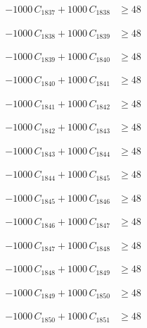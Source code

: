 \documentclass[a4paper,11pt]{article}
\begin{document}
\begin{align}
-1000\,C_{1837} + 1000\,C_{1838} &\geq 48 \nonumber
\end{align}

\begin{align}
-1000\,C_{1838} + 1000\,C_{1839} &\geq 48 \nonumber
\end{align}

\begin{align}
-1000\,C_{1839} + 1000\,C_{1840} &\geq 48 \nonumber
\end{align}

\begin{align}
-1000\,C_{1840} + 1000\,C_{1841} &\geq 48 \nonumber
\end{align}

\begin{align}
-1000\,C_{1841} + 1000\,C_{1842} &\geq 48 \nonumber
\end{align}

\begin{align}
-1000\,C_{1842} + 1000\,C_{1843} &\geq 48 \nonumber
\end{align}

\begin{align}
-1000\,C_{1843} + 1000\,C_{1844} &\geq 48 \nonumber
\end{align}

\begin{align}
-1000\,C_{1844} + 1000\,C_{1845} &\geq 48 \nonumber
\end{align}

\begin{align}
-1000\,C_{1845} + 1000\,C_{1846} &\geq 48 \nonumber
\end{align}

\begin{align}
-1000\,C_{1846} + 1000\,C_{1847} &\geq 48 \nonumber
\end{align}

\begin{align}
-1000\,C_{1847} + 1000\,C_{1848} &\geq 48 \nonumber
\end{align}

\begin{align}
-1000\,C_{1848} + 1000\,C_{1849} &\geq 48 \nonumber
\end{align}

\begin{align}
-1000\,C_{1849} + 1000\,C_{1850} &\geq 48 \nonumber
\end{align}

\begin{align}
-1000\,C_{1850} + 1000\,C_{1851} &\geq 48 \nonumber
\end{align}
\end{document}
